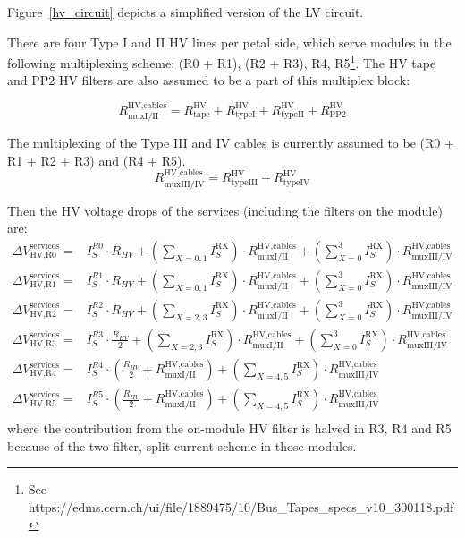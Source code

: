 Figure~\ref{hv_circuit} depicts a simplified version of the LV circuit.

There are four Type I and II HV lines per petal side, which serve modules in the following multiplexing
scheme: (R0 + R1), (R2 + R3), R4, R5\footnote{ See
https://edms.cern.ch/ui/file/1889475/10/Bus\_Tapes\_specs\_v10\_300118.pdf
}. The HV tape and PP2 HV filters are also assumed to be a part of this multiplex block:

\def\rhvmuxI{R^\text{HV,cables}_\text{muxI/II}}
\def\rhvmuxIII{R^\text{HV,cables}_\text{muxIII/IV}}
\def\rtape{R^\text{HV}_\text{tape}}
\def\rtypeI{R^\text{HV}_\text{typeI}}
\def\rtypeII{R^\text{HV}_\text{typeII}}
\def\rtypeIII{R^\text{HV}_\text{typeIII}}
\def\rtypeIV{R^\text{HV}_\text{typeIV}}
\[
\rhvmuxI = \rtape + \rtypeI + \rtypeII + R^\text{HV}_\text{PP2}
\]

The multiplexing of the Type III and IV cables is currently
assumed to be (R0 + R1 + R2 + R3) and (R4 + R5).
\[
\rhvmuxIII = \rtypeIII + \rtypeIV
\]

Then the HV voltage drops of the services (including the filters on the module) are:
\def\dvservices{\Delta V^\text{services}}
\begin{align}
\dvservices_\text{HV,R0} =& I^{R0}_S \cdot R_{HV}           + \left(\sum_{X=0,1} I^\text{RX}_S\right) \cdot \rhvmuxI + \left(\sum^3_{X=0} I^\text{RX}_S\right) \cdot \rhvmuxIII \\
\dvservices_\text{HV,R1} =& I^{R1}_S \cdot R_{HV}           + \left(\sum_{X=0,1} I^\text{RX}_S\right) \cdot \rhvmuxI + \left(\sum^3_{X=0} I^\text{RX}_S\right) \cdot \rhvmuxIII \\
\dvservices_\text{HV,R2} =& I^{R2}_S \cdot R_{HV}           + \left(\sum_{X=2,3} I^\text{RX}_S\right) \cdot \rhvmuxI + \left(\sum^3_{X=0} I^\text{RX}_S\right) \cdot \rhvmuxIII \\
\dvservices_\text{HV,R3} =& I^{R3}_S \cdot \frac{R_{HV}}{2} + \left(\sum_{X=2,3} I^\text{RX}_S\right) \cdot \rhvmuxI + \left(\sum^3_{X=0} I^\text{RX}_S\right) \cdot \rhvmuxIII \\
\dvservices_\text{HV,R4} =&                                I^{R4}_S \cdot \left(\frac{R_{HV}}{2} +\rhvmuxI \right)   + \left(\sum_{X=4,5} I^\text{RX}_S\right) \cdot \rhvmuxIII \\
\dvservices_\text{HV,R5} =&                                I^{R5}_S \cdot \left(\frac{R_{HV}}{2} +\rhvmuxI \right)   + \left(\sum_{X=4,5} I^\text{RX}_S\right) \cdot \rhvmuxIII \\
\end{align}
%
where the contribution from the on-module HV filter is halved in R3, R4 and R5 because of the
two-filter, split-current scheme in those modules.

